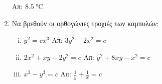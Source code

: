 \begin{enumerate}
		 \hfill Απ: $\SI{8,5}{\degreeCelsius}$  

	 \item Να βρεθούν οι ορθογώνιες τροχιές των καμπυλών:

		 \begin{enumerate}[i)]
			 \item $ y^{2}=cx^{3} $ \hfill Απ: $ 3y^{2}+2x^{2}=c $ 
			 \item $ 2x^{2}+xy-2y^{2}=c $ \hfill Απ: $ y^{2}+8xy-x^{2}=c $ 
			 \item $ x^{3}-y^{3}=c $ \hfill Απ: $ \frac{1}{y} + \frac{1}{x} =c $ 
		 \end{enumerate}


\end{enumerate}


